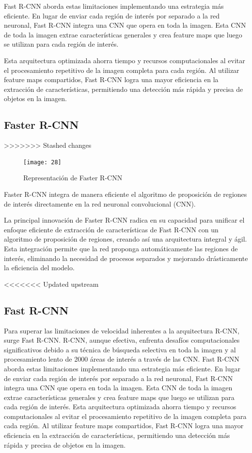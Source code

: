     Fast R-CNN aborda estas limitaciones implementando una estrategia más eficiente. En lugar de enviar cada región de interés por separado a la red neuronal, Fast R-CNN integra una CNN que opera en toda la imagen. Esta CNN de toda la imagen extrae características generales y crea feature maps que luego se utilizan para cada región de interés.
    
    Esta arquitectura optimizada ahorra tiempo y recursos computacionales al evitar el procesamiento repetitivo de la imagen completa para cada región. Al utilizar feature maps compartidos, Fast R-CNN logra una mayor eficiencia en la extracción de características, permitiendo una detección más rápida y precisa de objetos en la imagen.
    \pagebreak

	\subsection{Faster R-CNN}
>>>>>>> Stashed changes
	
	\begin{figure} 
		\centering
		\texttt{[image: 28]}
		\caption{Representación de Faster R-CNN}
	\end{figure}
	
	Faster R-CNN integra de manera eficiente el algoritmo de proposición de regiones de interés directamente en la red neuronal convolucional (CNN).
	
	La principal innovación de Faster R-CNN radica en su capacidad para unificar el enfoque eficiente de extracción de características de Fast R-CNN con un algoritmo de proposición de regiones, creando así una arquitectura integral y ágil. Esta integración permite que la red proponga automáticamente las regiones de interés, eliminando la necesidad de procesos separados y mejorando drásticamente la eficiencia del modelo.


<<<<<<< Updated upstream
	\subsection{Fast R-CNN}
	Para superar las limitaciones de velocidad inherentes a la arquitectura R-CNN, surge Fast R-CNN. R-CNN, aunque efectiva, enfrenta desafíos computacionales significativos debido a su técnica de búsqueda selectiva en toda la imagen y al procesamiento lento de 2000 áreas de interés a través de las CNN.
Fast R-CNN aborda estas limitaciones implementando una estrategia más eficiente. En lugar de enviar cada región de interés por separado a la red neuronal, Fast R-CNN integra una CNN que opera en toda la imagen. Esta CNN de toda la imagen extrae características generales y crea feature maps que luego se utilizan para cada región de interés.
Esta arquitectura optimizada ahorra tiempo y recursos computacionales al evitar el procesamiento repetitivo de la imagen completa para cada región. Al utilizar feature maps compartidos, Fast R-CNN logra una mayor eficiencia en la extracción de características, permitiendo una detección más rápida y precisa de objetos en la imagen.


